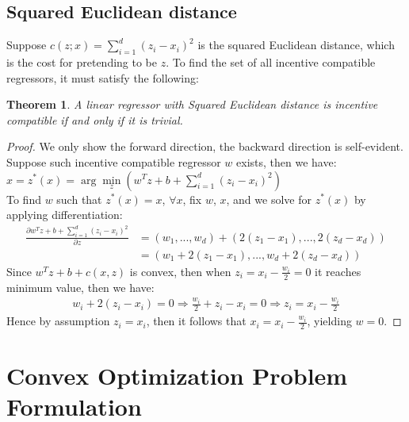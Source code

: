 \documentclass{article}
\newtheorem{theorem}{Theorem}[section]
\begin{document}






\subsection{Squared Euclidean distance}
Suppose $c(z;x) = \sum_{i=1}^{d}(z_i-x_i)^2$ is the squared Euclidean distance, which is the cost for pretending to be $z$. To find the set of all incentive compatible regressors, it must satisfy the following:  
\begin{theorem}
    A linear regressor with Squared Euclidean distance is incentive compatible if and only if it is trivial.
\end{theorem}
\begin{proof}
We only show the forward direction, the backward direction is self-evident. Suppose such incentive compatible regressor $w$ exists, then we have:
$x = z^*(x)= \arg\min\limits_z (w^T z + b + \sum_{i=1}^{d}(z_i-x_i)^2 )$\\
To find $w$ such that $z^*(x)=x$, $\forall x$, fix $w$, $x$, and we solve for $z^*(x)$ by applying differentiation: 
\begin{align*}
    \frac{\partial w^T z + b + \sum_{i=1}^{d}(z_i-x_i)^2}{\partial z}
    &= (w_1,..., w_d) + (2(z_1-x_1),..., 2(z_d-x_d)) \\
    &= (w_1+2(z_1-x_1),..., w_d+2(z_d-x_d)) 
\end{align*}
Since $w^Tz + b + c(x,z)$ is convex, then when $z_i = x_i - \frac{w_i}{2} = 0$ it reaches minimum value, then we have:
\begin{align*}
w_i + 2(z_i-x_i) = 0 \Rightarrow \frac{w_i}{2} + z_i - x_i = 0 \Rightarrow z_i = x_i - \frac{w_i}{2}
\end{align*}
 Hence by assumption $z_i = x_i$, then it follows that $x_i = x_i - \frac{w_i}{2}$, yielding $w = 0$.
\end{proof}


\section{Convex Optimization Problem Formulation}
\end{document}
